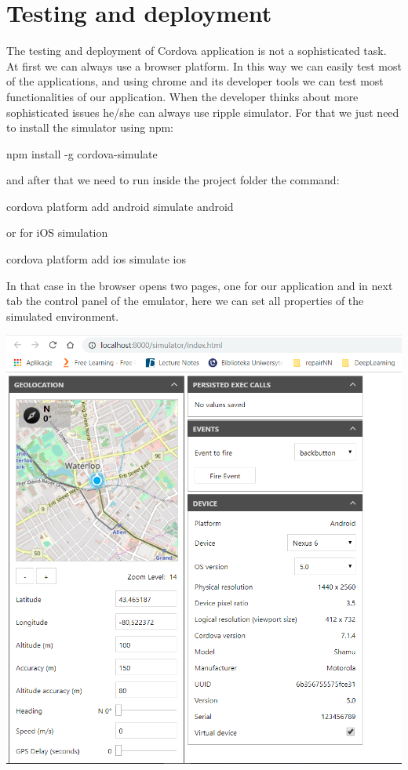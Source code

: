 \chapter{Testing and deployment}

The testing and deployment of Cordova application is not a sophisticated task. At first we can always use a browser platform. In this way we can easily test most of the applications, and using chrome and its developer tools we can test most functionalities of our application. When the developer thinks about more sophisticated issues he/she can always use ripple simulator. For that we just need to install the simulator using npm:

\begin{shell}
npm install -g cordova-simulate
\end{shell}

and after that we need to run inside the project folder the command:

\begin{shell}
cordova platform add android
simulate android
\end{shell}

or for iOS simulation

\begin{shell}
cordova platform add ios
simulate ios
\end{shell}

In that case in the browser opens two pages, one for our application and in next tab the control panel of the emulator, here we can set all properties of the simulated environment.

\includegraphics[width=\textwidth]{chapters/img/simulator_screen.png}

